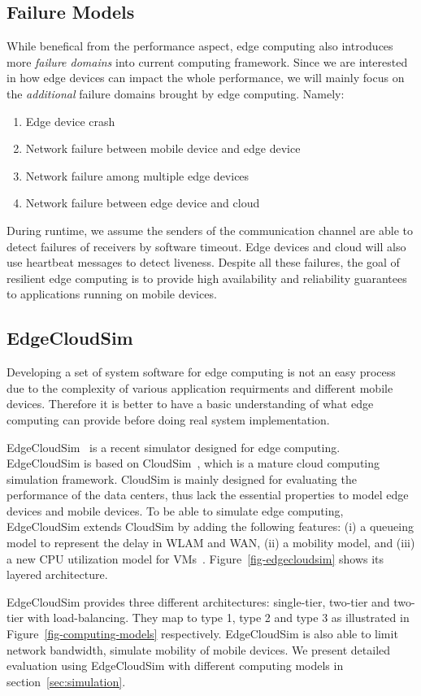 \subsection{Failure Models}
\label{sec:failure-models}
While benefical from the performance aspect, edge computing also introduces more
{\em failure domains} into current computing framework. Since we are interested
in how edge devices can impact the whole performance, we will mainly focus on
the {\em additional} failure domains brought by edge computing. Namely:
\begin{enumerate}
\item Edge device crash
\item Network failure between mobile device and edge device
\item Network failure among multiple edge devices
\item Network failure between edge device and cloud
\end{enumerate}

During runtime, we assume the senders of the communication channel are able to detect failures
of receivers by software timeout. Edge devices and cloud will also use heartbeat
messages to detect liveness. Despite all these failures, the goal of resilient
edge computing is to provide high availability and reliability guarantees to
applications running on mobile devices.

\subsection{EdgeCloudSim}
Developing a set of system software for edge computing is not an easy process due
to the complexity of various application requirments and different mobile devices.
Therefore it is better to have a basic understanding of what edge computing can provide
before doing real system implementation.

EdgeCloudSim~\cite{edgecloudsim} is a recent simulator designed for edge computing.
EdgeCloudSim is based on CloudSim~\cite{cloudsim}, which is a mature cloud computing simulation framework.
CloudSim is mainly designed for evaluating the performance of the data centers, thus lack the essential
properties to model edge devices and mobile devices. To be able to simulate edge computing, EdgeCloudSim
extends CloudSim by adding the following features: (i) a queueing model to represent the delay in WLAM and WAN,
(ii) a mobility model, and (iii) a new CPU utilization model for VMs~\cite{edgecloudsim}.
Figure~\ref{fig-edgecloudsim} shows its layered architecture.

EdgeCloudSim provides three different architectures: single-tier, two-tier and two-tier with load-balancing.
They map to type 1, type 2 and type 3 as illustrated in Figure~\ref{fig-computing-models} respectively.
EdgeCloudSim is also able to limit network bandwidth, simulate mobility of mobile devices.
We present detailed evaluation using EdgeCloudSim with different computing models in section~\ref{sec:simulation}.
